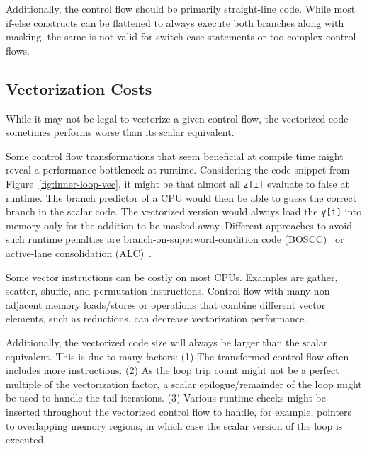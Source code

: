 \documentclass[sigplan,11pt,nonacm]{acmart}
\begin{document}
Additionally, the control flow should be primarily straight-line code. While most if-else 
constructs can be flattened to always execute both branches along with masking, the same is not 
valid for switch-case statements or too complex control flows.

\subsection{Vectorization Costs}
While it may not be legal to vectorize a given control flow, the vectorized code sometimes 
performs worse than its scalar equivalent.

Some control flow transformations that seem beneficial at compile time might reveal a performance
bottleneck at runtime. Considering the code snippet from Figure~\ref{fig:inner-loop-vec}, it might
be that almost all \texttt{z[i]} evaluate to false at runtime. The branch predictor of a CPU
would then be able to guess the correct branch in the scalar code. The vectorized version would
always load the \texttt{y[i]} into memory only for the addition to be masked away. Different 
approaches to avoid such runtime penalties are branch-on-superword-condition code 
(BOSCC)~\cite{10.5555/1299042.1299055,llvmboscc} or active-lane 
consolidation (ALC)~\cite{10.1007/s11227-022-04359-w,10.5555/3615924.3615932}.

Some vector instructions can be costly on most CPUs. Examples are gather, scatter, shuffle,
and permutation instructions. Control flow with many non-adjacent memory loads/stores or 
operations that combine different vector elements, such as reductions, can decrease vectorization 
performance.

Additionally, the vectorized code size will always be larger than the scalar equivalent. This is
due to many factors: (1) The transformed control flow often includes more instructions.
(2) As the loop trip count might not be a perfect multiple of the vectorization factor, a scalar
epilogue/remainder of the loop might be used to handle the tail iterations. (3) Various runtime
checks might be inserted throughout the vectorized control flow to handle, for example, pointers 
to overlapping memory regions, in which case the scalar version of the loop is executed.



\end{document}
